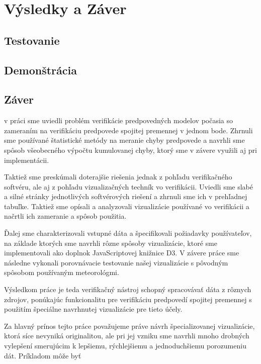 \chapter{Výsledky a Záver}

\section{Testovanie}

\section{Demonštrácia}

\section{Záver}
v práci sme uviedli problém verifikácie predpovedných modelov počasia so zameraním na verifikáciu predpovede spojitej premennej v jednom bode. Zhrnuli sme používané štatistické metódy na meranie chyby predpovede a navrhli sme spôsob všeobecného výpočtu kumulovanej chyby, ktorý sme v závere využili aj pri implementácii.

Taktiež sme preskúmali doterajšie riešenia jednak z pohľadu verifikačného softvéru, ale aj z pohľadu vizualizačných techník vo verifikácii. Uviedli sme slabé a silné stránky jednotlivých softvérových riešení a zhrnuli sme ich v prehľadnej tabuľke. Taktiež sme opísali a analyzovali vizualizácie používané vo verifikácii a načrtli ich zameranie a spôsob použitia.

Ďalej sme charakterizovali vstupné dáta a špecifikovali požiadavky používateľov, na základe ktorých sme navrhli rôzne spôsoby vizualizácie, ktoré sme implementovali ako doplnok JavaScriptovej knižnice D3. V závere práce sme následne vykonali porovnávacie testovanie našej vizualizácie s pôvodným spôsobom používaným meteorológmi.

Výsledkom práce je teda verifikačný nástroj schopný spracovávať dáta z rôznych zdrojov, ponúkajúc funkcionalitu pre verifikáciu predpovedí spojitej premennej s použitím špeciálne navrhnutej vizualizácie pre tieto účely.

Za hlavný prínos tejto práce považujeme práve návrh špecializovanej vizualizácie, ktorá síce nevyniká originalitou, ale pri jej vzniku sme navrhli mnoho drobných vylepšení smerujúcim k lepšiemu, rýchlejšiemu a jednoduchšiemu porozumeniu dát. Príkladom môže byť



